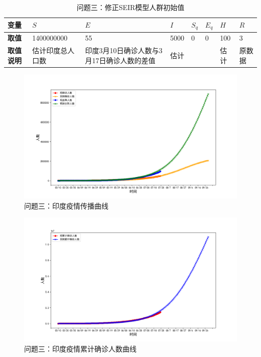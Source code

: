 \documentclass[withoutpre]{cumcmthesis} %
\begin{document}
\begin{table}[H]\small
    \caption{问题三：修正SEIR模型人群初始值}
    \label{tab:initvalue2} \centering
    \begin{tabular}{p{1.5cm}p{2cm}p{3cm}p{1cm}p{1cm}p{1cm}p{1cm}p{1cm}}
        \toprule[1.5pt]
        \textbf{变量} & $S$ & $E$ & $I$ & $S_q$ & $E_q$ & $H$ & $R$  \\
        \midrule[1pt]
        \textbf{取值} & 1400000000& 55& 5000 &0& 0& 100&3 \\
        \textbf{取值说明} & 估计印度总人口数& 印度3月10日确诊人数与3月17日确诊人数的差值&  估计&  \cite{reference4} &  \cite{reference4}& 估计 &  原数据\\
        \bottomrule[1.5pt]
    \end{tabular}
\end{table}

\begin{figure}[!h]
    \centering
    \includegraphics[width=1.0\textwidth]{figures/IndiaModel.png}
    \caption{问题三：印度疫情传播曲线}
    \label{fig:IndiaModel}
\end{figure}

\begin{figure}[!h]
    \centering
    \includegraphics[width=1.0\textwidth]{figures/cumulative.png}
    \caption{问题三：印度疫情累计确诊人数曲线}
    \label{fig:cumulative}
\end{figure}
\end{document}
